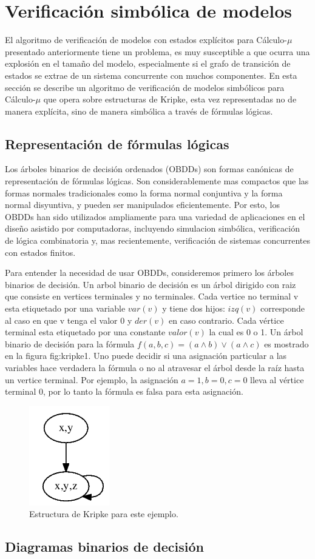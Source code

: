 \chapter{Verificación simbólica de modelos}

El algoritmo de verificación de modelos con estados explícitos para Cálculo-$\mu$ presentado anteriormente tiene un problema, es muy susceptible a que ocurra una explosión en el tamaño del modelo, especialmente si el grafo de transición de estados se extrae de un sistema concurrente con muchos componentes. En esta sección se describe un algoritmo de verificación de modelos simbólicos para Cálculo-$\mu$ que opera sobre estructuras de Kripke, esta vez representadas no de manera explícita, sino de manera simbólica a través de fórmulas lógicas.

\section{Representación de fórmulas lógicas}

Los árboles binarios de decisión ordenados (OBDDs) son formas canónicas de representación de fórmulas lógicas. Son considerablemente mas compactos que las formas normales tradicionales como la forma normal conjuntiva y la forma normal disyuntiva, y pueden ser manipulados eficientemente. Por esto, los OBDDs han sido utilizados ampliamente para una variedad de aplicaciones en el diseño asistido por computadoras, incluyendo simulacion simbólica, verificación de lógica combinatoria y, mas recientemente, verificación de sistemas concurrentes con estados finitos.

Para entender la necesidad de usar OBDDs, consideremos primero los árboles binarios de decisión. Un arbol binario de decisión es un árbol dirigido con raiz que consiste en vertices terminales y no terminales. Cada vertice no terminal v esta etiquetado por una variable $var(v)$ y tiene dos hijos: $izq(v)$ corresponde al caso en que v tenga el valor 0 y $der(v)$ en caso contrario. Cada vértice terminal esta etiquetado por una constante $valor(v)$ la cual es 0 o 1. Un árbol binario de decisión para la fórmula $f(a,b,c) = (a \land b) \lor (a \land c)$ es mostrado en la figura {fig:kripke1}. Uno puede decidir si una asignación particular a las variables hace verdadera la fórmula o no al atravesar el árbol desde la raíz hasta un vertice terminal. Por ejemplo, la asignación ${ a = 1, b = 0, c = 0}$ lleva al vértice terminal 0, por lo tanto la fórmula es falsa para esta asignación.

\begin{figure}[h]
  \centering
  \includegraphics{Figures/kripke.png}
  \caption{Estructura de Kripke para este ejemplo.}
  \label{fig:kripke1}
\end{figure}

\section{Diagramas binarios de decisión}




